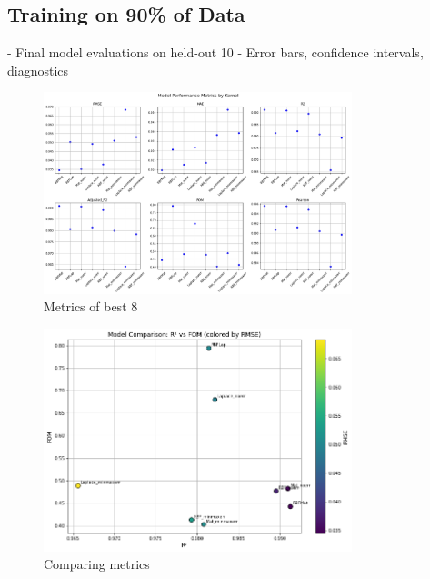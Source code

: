 \documentclass{article}
\begin{document}
\subsection{Training on 90\% of Data}
- Final model evaluations on held-out 10%
- Error bars, confidence intervals, diagnostics

\begin{figure}[H]
    \centering
    \includegraphics[width=0.8\textwidth]{LatexPlots/final_gps_plots/metrics_of_finalists.png}
    \caption{Metrics of best 8}
    \label{fig:best8_metrics}
\end{figure}

\begin{figure}[H]
    \centering
    \includegraphics[width=0.8\textwidth]{LatexPlots/final_gps_plots/metric_of_finalists_comparison.png}
    \caption{Comparing metrics}
    \label{fig:comparing_metrics}
\end{figure}
\end{document}
